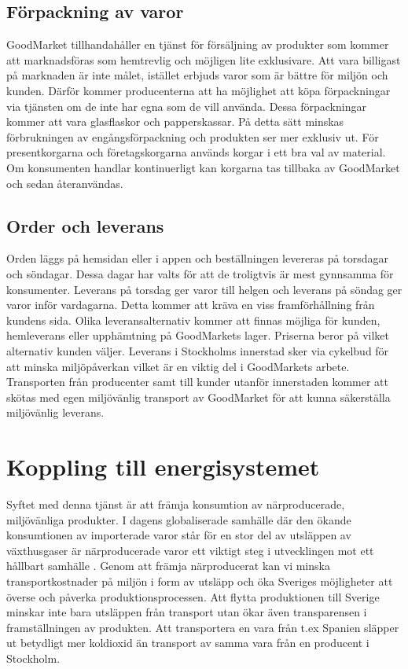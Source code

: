 \documentclass[10pt,a4paper,oneside]{article}
\begin{document}
\subsection{Förpackning av varor}
GoodMarket tillhandahåller en tjänst för försäljning av produkter som kommer att marknadsföras som hemtrevlig och möjligen lite exklusivare. Att vara billigast på marknaden är inte målet, istället erbjuds varor som är bättre för miljön och kunden. Därför kommer producenterna att ha möjlighet att köpa förpackningar via tjänsten om de inte har egna som de vill använda. Dessa förpackningar kommer att vara glasflaskor och papperskassar. På detta sätt minskas förbrukningen av engångsförpackning och produkten ser mer exklusiv ut. För presentkorgarna och företagskorgarna används korgar i ett bra val av material. Om konsumenten handlar kontinuerligt kan korgarna tas tillbaka av GoodMarket och sedan återanvändas. 

\subsection{Order och leverans}
Orden läggs på hemsidan eller i appen och beställningen levereras på torsdagar och söndagar. Dessa dagar har valts för att de troligtvis är mest gynnsamma för konsumenter. Leverans på torsdag ger varor till helgen och leverans på söndag ger varor inför vardagarna. Detta kommer att kräva en viss framförhållning från kundens sida. Olika leveransalternativ kommer att finnas möjliga för kunden, hemleverans eller upphämtning på GoodMarkets lager. Priserna beror på vilket alternativ kunden väljer. Leverans i Stockholms innerstad sker via cykelbud för att minska miljöpåverkan vilket är en viktig del i GoodMarkets arbete. Transporten från producenter samt till kunder utanför innerstaden kommer att skötas med egen miljövänlig transport av GoodMarket för att kunna säkerställa miljövänlig leverans. 
\newpage

\section{Koppling till energisystemet}

Syftet med denna tjänst är att främja konsumtion av närproducerade, miljövänliga produkter.  I dagens globaliserade samhälle där den ökande konsumtionen av importerade varor står för en stor del av utsläppen av växthusgaser är närproducerade varor ett viktigt steg i utvecklingen mot ett hållbart samhälle \cite{N1}. Genom att främja närproducerat kan vi minska transportkostnader på miljön i form av utsläpp och öka Sveriges möjligheter att överse och påverka produktionsprocessen. Att flytta produktionen till Sverige minskar inte bara utsläppen från transport utan ökar även transparensen i framställningen av produkten. Att transportera en vara från t.ex Spanien släpper ut betydligt mer koldioxid än transport av samma vara från en producent i Stockholm. \\  
\end{document}
